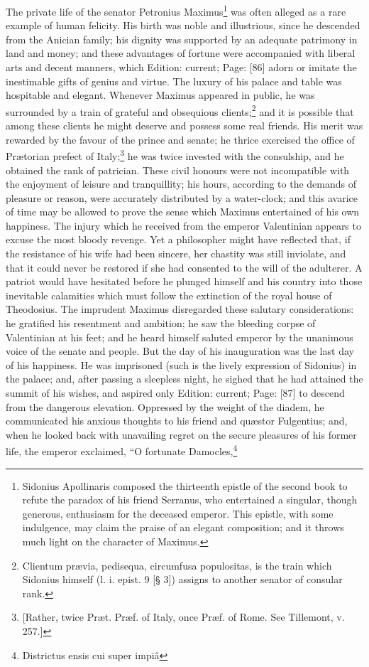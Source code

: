 The private life of the senator Petronius Maximus\footnote{Sidonius Apollinaris composed the thirteenth epistle of the second book to refute the paradox of his friend Serranus, who entertained a singular, though generous, enthusiasm for the deceased emperor. This epistle, with some indulgence, may claim the praise of an elegant composition; and it throws much light on the character of Maximus.} was often alleged as a rare example of human felicity. His birth was noble and illustrious, since he descended from the Anician family; his dignity was supported by an adequate patrimony in land and money; and these advantages of fortune were accompanied with liberal arts and decent manners, which Edition: current; Page: [86] adorn or imitate the inestimable gifts of genius and virtue. The luxury of his palace and table was hospitable and elegant. Whenever Maximus appeared in public, he was surrounded by a train of grateful and obsequious clients;\footnote{Clientum prævia, pedisequa, circumfusa populositas, is the train which Sidonius himself (l. i. epist. 9 [§ 3]) assigns to another senator of consular rank.} and it is possible that among these clients he might deserve and possess some real friends. His merit was rewarded by the favour of the prince and senate; he thrice exercised the office of Prætorian prefect of Italy;\footnote{[Rather, twice Præt. Præf. of Italy, once Præf. of Rome. See Tillemont, v. 257.]} he was twice invested with the consulship, and he obtained the rank of patrician. These civil honours were not incompatible with the enjoyment of leisure and tranquillity; his hours, according to the demands of pleasure or reason, were accurately distributed by a water-clock; and this avarice of time may be allowed to prove the sense which Maximus entertained of his own happiness. The injury which he received from the emperor Valentinian appears to excuse the most bloody revenge. Yet a philosopher might have reflected that, if the resistance of his wife had been sincere, her chastity was still inviolate, and that it could never be restored if she had consented to the will of the adulterer. A patriot would have hesitated before he plunged himself and his country into those inevitable calamities which must follow the extinction of the royal house of Theodosius. The imprudent Maximus disregarded these salutary considerations: he gratified his resentment and ambition; he saw the bleeding corpse of Valentinian at his feet; and he heard himself saluted emperor by the unanimous voice of the senate and people. But the day of his inauguration was the last day of his happiness. He was imprisoned (such is the lively expression of Sidonius) in the palace; and, after passing a sleepless night, he sighed that he had attained the summit of his wishes, and aspired only Edition: current; Page: [87] to descend from the dangerous elevation. Oppressed by the weight of the diadem, he communicated his anxious thoughts to his friend and quæstor Fulgentius; and, when he looked back with unavailing regret on the secure pleasures of his former life, the emperor exclaimed, \texthebrew{“}O fortunate Damocles,\footnote{Districtus ensis cui super impiâ

}
